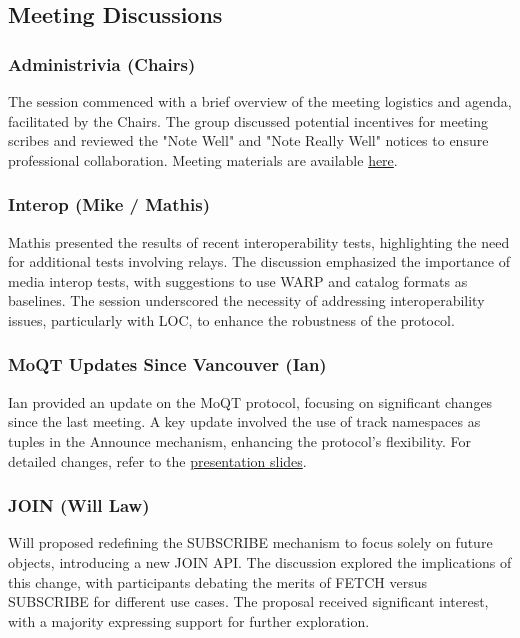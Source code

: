 \documentclass{article}
\begin{document}
\subsection{Meeting Discussions}

\subsubsection{Administrivia (Chairs)}
The session commenced with a brief overview of the meeting logistics and agenda, facilitated by the Chairs. The group discussed potential incentives for meeting scribes and reviewed the "Note Well" and "Note Really Well" notices to ensure professional collaboration. Meeting materials are available \href{https://datatracker.ietf.org/meeting/121/materials/slides-121-moq-chair-slides-00}{here}.

\subsubsection{Interop (Mike / Mathis)}
Mathis presented the results of recent interoperability tests, highlighting the need for additional tests involving relays. The discussion emphasized the importance of media interop tests, with suggestions to use WARP and catalog formats as baselines. The session underscored the necessity of addressing interoperability issues, particularly with LOC, to enhance the robustness of the protocol.

\subsubsection{MoQT Updates Since Vancouver (Ian)}
Ian provided an update on the MoQT protocol, focusing on significant changes since the last meeting. A key update involved the use of track namespaces as tuples in the Announce mechanism, enhancing the protocol's flexibility. For detailed changes, refer to the \href{https://datatracker.ietf.org/meeting/121/materials/slides-121-moq-moq-transport-updates-since-vancouver-00}{presentation slides}.

\subsubsection{JOIN (Will Law)}
Will proposed redefining the SUBSCRIBE mechanism to focus solely on future objects, introducing a new JOIN API. The discussion explored the implications of this change, with participants debating the merits of FETCH versus SUBSCRIBE for different use cases. The proposal received significant interest, with a majority expressing support for further exploration.
\end{document}
